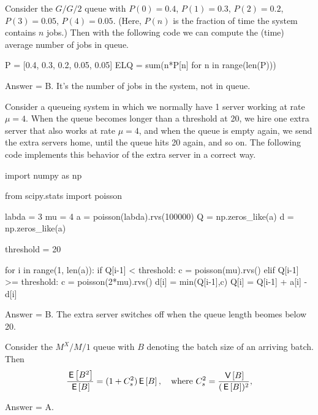 \begin{exercise}[201903]
  Consider the $G/G/2$ queue with $P(0) = 0.4$, $P(1)=0.3$, $P(2)= 0.2$, $P(3)=0.05$, $P(4)=0.05$. (Here, $P(n)$ is the fraction of time the system contains $n$ jobs.)
Then with the following code we can compute the (time) average number of jobs in queue.
\begin{pyconsole}
P = [0.4, 0.3, 0.2, 0.05, 0.05]
ELQ = sum(n*P[n] for n in range(len(P)))
\end{pyconsole}

\begin{solution}
Answer = B. It's the number of jobs in the system, not in queue.
\end{solution}
\end{exercise}

\begin{exercise}[201903]
  Consider a queueing system in which we normally have 1 server working at rate $\mu=4$.
  When the queue becomes longer than a threshold at 20, we hire one extra server that also works at rate $\mu=4$, and when the queue is empty again, we send the extra servers home, until the queue hits 20 again, and so on.
  The following code implements this behavior of the extra server in a correct way.

    \begin{pyverbatim}
import numpy as np

from scipy.stats import poisson

labda = 3
mu = 4
a = poisson(labda).rvs(100000)
Q = np.zeros_like(a)
d = np.zeros_like(a)

threshold = 20

for i in range(1, len(a)):
    if Q[i-1] < threshold:
        c = poisson(mu).rvs()
    elif Q[i-1] >= threshold:
        c = poisson(2*mu).rvs()
    d[i] = min(Q[i-1],c)
    Q[i] = Q[i-1] + a[i] - d[i]
    
    \end{pyverbatim}

\begin{solution}
Answer = B. The extra server switches off when the queue length beomes below 20.
\end{solution}
\end{exercise}

\begin{exercise}[201903]
  Consider the $M^X/M/1$ queue with $B$ denoting the batch size of an arriving batch. Then
\begin{equation*}
  \frac{\,\mathsf{E}\left[B^2\right]}{\,\mathsf{E}\left[B\right]} = (1+C_s^2)\,\mathsf{E}\left[B\right], \quad\text{where }
C_s^2 = \frac{\,\mathsf{V}\left[B\right]}{(\,\mathsf{E}\left[B\right])^2},
\end{equation*}

\begin{solution}
Answer = A.
\end{solution}
\end{exercise}

